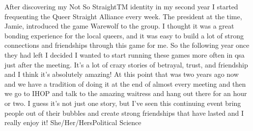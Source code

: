 {After discovering my Not So StraightTM identity in my second year I started 
frequenting the Queer Straight Alliance every week. The president at the time, 
Jamie, introduced the game Warewolf to the group. I thought it was a great 
bonding experience for the local queers, and it was easy to build a lot of 
strong connections and friendships through this game for me. So the following 
year once they had left I decided I wanted to start running these games more 
often in qsa just after the meeting. It's a lot of crazy stories of betrayal, 
trust, and friendship and I think it's absolutely amazing! At this point that 
was two years ago now and we have a tradition of doing it at the end of almost 
every meeting and then we go to IHOP and talk to the amazing waitress and hang 
out there for an hour or two. I guess it's not just one story, but I've seen 
this continuing event bring people out of their bubbles and create strong 
friendships that have lasted and I really enjoy it!}
{She/Her/Hers}{Political Science}{}
{\asexualflagstory}
